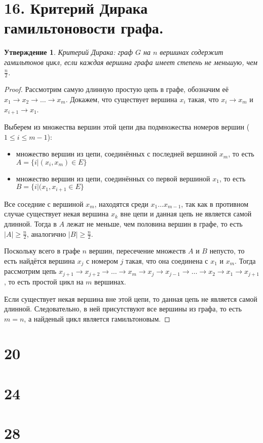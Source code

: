 \documentclass[a4paper,12pt]{article}
\newtheorem*{Statements}{Утверждение}
\begin{document}
    \section*{16. Критерий Дирака гамильтоновости графа.}
    \begin{Statements}
        Критерий Дирака: граф $G$ на $n$ вершинах содержит гамильтонов цикл,
        если каждая вершина графа имеет степень не меньшую, чем $\frac{n}{2}$.
    \end{Statements}
    \begin{proof}
        Рассмотрим самую длинную простую цепь в графе, обозначим её
        $x_1\rightarrow x_2\rightarrow\ldots\rightarrow x_m$. Докажем, что
        существует вершина $x_i$ такая, что $x_i\rightarrow x_m$ и $x_{i+1}
        \rightarrow x_1$.
        \par Выберем из множества вершин этой цепи два подмножества номеров
        вершин ($1\leq i \leq m-1$):
        \begin{itemize}
            \item множество вершин из цепи, соединённых с последней вершиной
                $x_m$, то есть $A=\{i|(x_i, x_m)\in E\}$
            \item множество вершин из цепи, соединённых со первой вершиной
                $x_1$, то есть $B=\{i|(x_1, x_{i+1}\in E\}$
        \end{itemize}
        Все соседние с вершиной $x_m$, находятся среди $x_1\ldots x_{m-1}$, так
        как в противном случае существует некая вершина $x_k$ вне цепи и данная
        цепь не является самой длинной. Тогда в $A$ лежат не меньше,
        чем половина вершин в графе, то есть $|A|\geq\frac{n}{2}$, аналогично
        $|B|\geq\frac{n}{2}$. \par
        Поскольку всего в графе $n$ вершин, пересечение множеств $A$ и $B$
        непусто, то есть найдётся  вершина $x_j$ с номером $j$ такая, что она
        соединена с $x_1$ и $x_m$. Тогда рассмотрим цепь $x_{j+1}\rightarrow
        x_{j+2}\rightarrow \ldots\rightarrow x_{m} \rightarrow x_j \rightarrow
        x_{j-1}\rightarrow \ldots \rightarrow x_2 \rightarrow x_1 \rightarrow
        x_{j+1}$, то есть простой цикл на $m$ вершинах.
        \par Если существует некая вершина вне этой цепи, то данная цепь не
        является самой длинной. Следовательно, в ней присутствуют все вершины
        из графа, то есть $m=n$, а найденый цикл является гамильтоновым.
    \end{proof}


    \section*{20}



    \section*{24}


    \section*{28}
\end{document}

